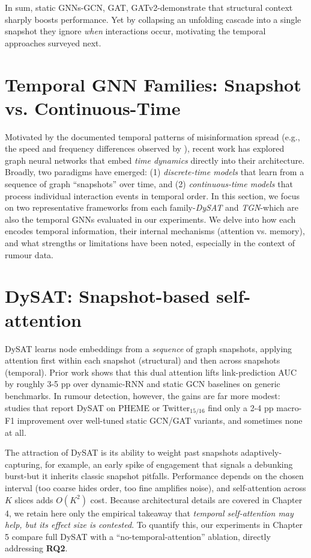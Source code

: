 \documentclass{cshonours}
\begin{document}
In sum, static GNNs-GCN, GAT, GATv2-demonstrate that structural context sharply boosts performance.  Yet by collapsing an unfolding cascade into a single snapshot they ignore \emph{when} interactions occur, motivating the temporal approaches surveyed next.


\section{Temporal GNN Families: Snapshot vs. Continuous-Time}
Motivated by the documented temporal patterns of misinformation spread (e.g., the speed and frequency differences observed by \cite{vosoughi2018spread}), recent work has explored graph neural networks that embed \emph{time dynamics} directly into their architecture. Broadly, two paradigms have emerged: (1) \emph{discrete-time models} that learn from a sequence of graph ``snapshots'' over time, and (2) \emph{continuous-time models} that process individual interaction events in temporal order. In this section, we focus on two representative frameworks from each family-\emph{DySAT} and \emph{TGN}-which are also the temporal GNNs evaluated in our experiments. We delve into how each encodes temporal information, their internal mechanisms (attention vs. memory), and what strengths or limitations have been noted, especially in the context of rumour data.

\section*{DySAT: Snapshot-based self-attention}

DySAT \cite{sankar2020dysat} learns node embeddings from a \emph{sequence} of graph snapshots, applying attention first within each snapshot (structural) and then across snapshots (temporal). Prior work shows that this dual attention lifts link-prediction AUC by roughly 3-5 pp over dynamic-RNN and static GCN baselines on generic benchmarks. In rumour detection, however, the gains are far more modest: studies that report DySAT on PHEME or Twitter$_{15/16}$ find only a 2-4 pp macro-F1 improvement over well-tuned static GCN/GAT variants, and sometimes none at all.  

The attraction of DySAT is its ability to weight past snapshots adaptively-capturing, for example, an early spike of engagement that signals a debunking burst-but it inherits classic snapshot pitfalls. Performance depends on the chosen interval (too coarse hides order, too fine amplifies noise), and self-attention across $K$ slices adds $O(K^2)$ cost. Because architectural details are covered in Chapter 4, we retain here only the empirical takeaway that \emph{temporal self-attention may help, but its effect size is contested}. To quantify this, our experiments in Chapter 5 compare full DySAT with a ``no-temporal-attention'' ablation, directly addressing \textbf{RQ2}.  
\end{document}
